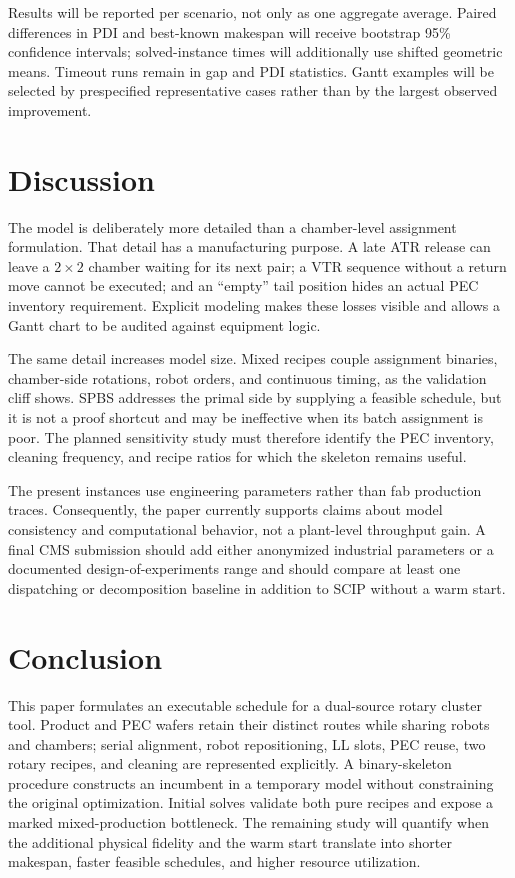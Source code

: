 \documentclass[5p,times,procedia]{elsarticle}
\begin{document}
Results will be reported per scenario, not only as one aggregate average. Paired differences in PDI and best-known makespan will receive bootstrap 95\% confidence intervals; solved-instance times will additionally use shifted geometric means. Timeout runs remain in gap and PDI statistics. Gantt examples will be selected by prespecified representative cases rather than by the largest observed improvement.

\section{Discussion}

The model is deliberately more detailed than a chamber-level assignment formulation. That detail has a manufacturing purpose. A late ATR release can leave a $2\times2$ chamber waiting for its next pair; a VTR sequence without a return move cannot be executed; and an ``empty'' tail position hides an actual PEC inventory requirement. Explicit modeling makes these losses visible and allows a Gantt chart to be audited against equipment logic.

The same detail increases model size. Mixed recipes couple assignment binaries, chamber-side rotations, robot orders, and continuous timing, as the validation cliff shows. SPBS addresses the primal side by supplying a feasible schedule, but it is not a proof shortcut and may be ineffective when its batch assignment is poor. The planned sensitivity study must therefore identify the PEC inventory, cleaning frequency, and recipe ratios for which the skeleton remains useful.

The present instances use engineering parameters rather than fab production traces. Consequently, the paper currently supports claims about model consistency and computational behavior, not a plant-level throughput gain. A final CMS submission should add either anonymized industrial parameters or a documented design-of-experiments range and should compare at least one dispatching or decomposition baseline in addition to SCIP without a warm start.

\section{Conclusion}

This paper formulates an executable schedule for a dual-source rotary cluster tool. Product and PEC wafers retain their distinct routes while sharing robots and chambers; serial alignment, robot repositioning, LL slots, PEC reuse, two rotary recipes, and cleaning are represented explicitly. A binary-skeleton procedure constructs an incumbent in a temporary model without constraining the original optimization. Initial solves validate both pure recipes and expose a marked mixed-production bottleneck. The remaining study will quantify when the additional physical fidelity and the warm start translate into shorter makespan, faster feasible schedules, and higher resource utilization.
\end{document}
